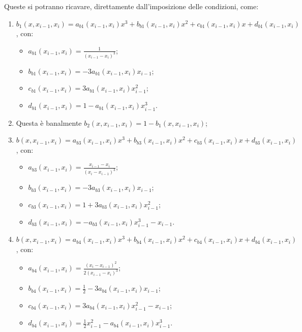 \documentclass[a4paper,11pt]{article}
\begin{document}
\begin{itemize}
		Queste si potranno ricavare, direttamente dall'imposizione delle condizioni, come:
		\begin{enumerate}
			\item $b_{1}\left(x,x_{i-1},x_{i}\right)=a_{b1}\left(x_{i-1},x_{i}\right)x^{3}+b_{b1}\left(x_{i-1},x_{i}\right)x^{2}+c_{b1}\left(x_{i-1},x_{i}\right)x+d_{b1}\left(x_{i-1},x_{i}\right)$,
				con:
				\begin{itemize}
					\item $a_{b1}\left(x_{i-1},x_{i}\right)=\frac{1}{\left(x_{i-1}-x_{i}\right)^{3}}$;
					\item $b_{b1}\left(x_{i-1},x_{i}\right)=-3a_{b1}\left(x_{i-1},x_{i}\right)x_{i-1}$;
					\item $c_{b1}\left(x_{i-1},x_{i}\right)=3a_{b1}\left(x_{i-1},x_{i}\right)x_{i-1}^{2}$;
					\item $d_{b1}\left(x_{i-1},x_{i}\right)=1-a_{b1}\left(x_{i-1},x_{i}\right)x_{i-1}^{3}$.
				\end{itemize}
			\item Questa è banalmente $b_{2} \left( x, x_{i-1}, x_{i} \right) = 1 - b_{1}\left(x,x_{i-1},x_{i}\right)$;
			\item $b\left(x,x_{i-1},x_{i}\right)=a_{b3}\left(x_{i-1},x_{i}\right)x^{3}+b_{b3}\left(x_{i-1},x_{i}\right)x^{2}+c_{b3}\left(x_{i-1},x_{i}\right)x+d_{b3}\left(x_{i-1},x_{i}\right)$,
				con:
				\begin{itemize}
					\item $a_{b3}\left(x_{i-1},x_{i}\right)=\frac{x_{i-1}-x_{i}}{\left(x_{i}-x_{i-1}\right)^{3}}$;
					\item $b_{b3}\left(x_{i-1},x_{i}\right)=-3a_{b3}\left(x_{i-1},x_{i}\right)x_{i-1}$;
					\item $c_{b3}\left(x_{i-1},x_{i}\right)=1+3a_{b3}\left(x_{i-1},x_{i}\right)x_{i-1}^{2}$;
					\item $d_{b3}\left(x_{i-1},x_{i}\right)=-a_{b3}\left(x_{i-1},x_{i}\right)x_{i-1}^{3}-x_{i-1}$.
				\end{itemize}
			\item $b\left(x,x_{i-1},x_{i}\right)=a_{b4}\left(x_{i-1},x_{i}\right)x^{3}+b_{b4}\left(x_{i-1},x_{i}\right)x^{2}+c_{b4}\left(x_{i-1},x_{i}\right)x+d_{b4}\left(x_{i-1},x_{i}\right)$,
				con:
				\begin{itemize}
					\item $a_{b4}\left(x_{i-1},x_{i}\right)=\frac{\left(x_{i}-x_{i-1}\right)^{2}}{2\left(x_{i-1}-x_{i}\right)^{3}}$;
					\item $b_{b4}\left(x_{i-1},x_{i}\right)=\frac{1}{2}-3a_{b4}\left(x_{i-1},x_{i}\right)x_{i-1}$;
					\item $c_{b4}\left(x_{i-1},x_{i}\right)=3a_{b4}\left(x_{i-1},x_{i}\right)x_{i-1}^{2}-x_{i-1}$;
					\item $d_{b4}\left(x_{i-1},x_{i}\right)=\frac{1}{2}x_{i-1}^{2}-a_{b4}\left(x_{i-1},x_{i}\right)x_{i-1}^{3}$.
				\end{itemize}
		\end{enumerate}


\end{itemize}
\end{document}
